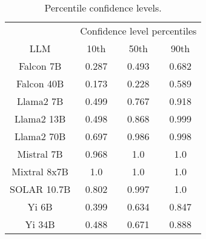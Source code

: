 \begin{table*}
\centering
\begin{tabular}{c|c|c|c}
& \multicolumn{3}{c}{Confidence level percentiles} \\ 
LLM & 10th & 50th & 90th\\ \hline
Falcon 7B & 0.287 & 0.493 & 0.682\\
Falcon 40B & 0.173 & 0.228 & 0.589\\
Llama2 7B & 0.499 & 0.767 & 0.918\\
Llama2 13B & 0.498 & 0.868 & 0.999\\
Llama2 70B & 0.697 & 0.986 & 0.998\\
Mistral 7B & 0.968 & 1.0 & 1.0\\
Mixtral 8x7B & 1.0 & 1.0 & 1.0\\
SOLAR 10.7B & 0.802 & 0.997 & 1.0\\
Yi 6B & 0.399 & 0.634 & 0.847\\
Yi 34B & 0.488 & 0.671 & 0.888\\
\hline
\end{tabular}
\caption{Percentile confidence levels.}
\label{tab:percentile_conf}
\end{table*}
